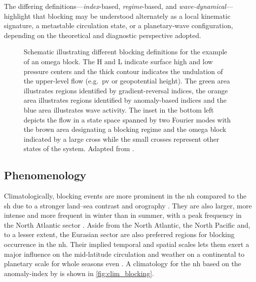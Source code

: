 The differing definitions---\emph{index}-based, \emph{regime}-based, and
\emph{wave-dynamical}---highlight that blocking may be understood alternately as
a local kinematic signature, a metastable circulation state, or a
planetary-wave configuration, depending on the theoretical
and diagnostic perspective adopted.

\begin{figure}[htpb]
    \centering
    
    \caption{Schematic illustrating different blocking definitions for the example
        of an omega block. The H and L indicate surface high and low pressure centers
        and the thick contour indicates the undulation of the upper-level flow
        (e.g.~\gls{pv} or geopotential height). The green area illustrates regions
        identified by gradient-reversal indices, the orange area illustrates regions
        identified by anomaly-based indices and the blue area illustrates wave
        activity. The inset in the bottom left depicts the flow in a state space
        spanned
        by two Fourier modes with the brown area designating a blocking regime and
        the omega block indicated by a large cross while the small crosses
        represent other states of the system. Adapted from
        \textcite{bluesteinSynopticDynamicMeteorology1993}.}
    \label{fig:block_def}
\end{figure}

\subsection{Phenomenology} \label{sec:intro_block_Phenomenology}
Climatologically, blocking events are more prominent in the \gls{nh}
compared to the \gls{sh} due to a stronger land--sea contrast and orography
\parencite{woollingsBlockingItsResponse2018}. They are also larger, more
intense and more frequent in winter than in summer, with a peak frequency in
the North Atlantic sector
\parencite{nabizadeh3DStructureNorthern2021}. Aside from the North Atlantic,
the North Pacific and, to a lesser extent, the Eurasian sector are also
preferred regions for blocking occurrence in the \gls{nh}. Their implied
temporal and spatial scales lets them exert a major influence on the
mid-latitude circulation and weather on a continental to planetary scale for
whole seasons even \parencite{jensenDynamicAnalysisRecord2015}. A climatology
for the \gls{nh} based on the anomaly-index by
\textcite{schwierzPerspicaciousIndicatorsAtmospheric2004} is shown in
\cref{fig:clim_blocking}.

